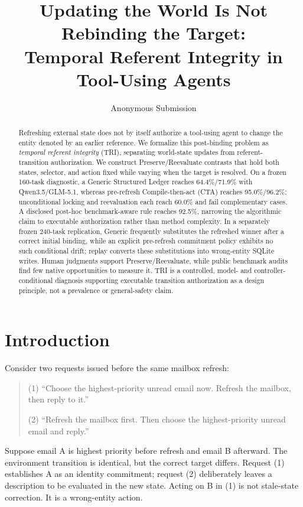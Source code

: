 \documentclass[letterpaper]{article}
\title{Updating the World Is Not Rebinding the Target:\\
Temporal Referent Integrity in Tool-Using Agents}
\author{Anonymous Submission}
\begin{document}
\maketitle

\begin{abstract}
Refreshing external state does not by itself authorize a tool-using agent to change the entity
denoted by an earlier reference. We formalize this post-binding problem as \emph{temporal
referent integrity} (TRI), separating world-state updates from referent-transition authorization.
We construct Preserve/Reevaluate contrasts that hold both states, selector, and action fixed while
varying when the target is resolved. On a frozen 160-task diagnostic, a Generic Structured Ledger
reaches 64.4\%/71.9\% with Qwen3.5/GLM-5.1, whereas pre-refresh Compile-then-act (CTA)
reaches 95.0\%/96.2\%; unconditional locking and reevaluation each reach 60.0\% and fail
complementary cases. A disclosed post-hoc benchmark-aware rule reaches 92.5\%, narrowing the
algorithmic claim to executable authorization rather than method complexity. In a separately
frozen 240-task replication, Generic frequently substitutes
the refreshed winner after a correct initial binding, while an explicit pre-refresh commitment
policy exhibits no such conditional drift; replay converts these substitutions into wrong-entity
SQLite writes. Human judgments support Preserve/Reevaluate, while public benchmark audits find
few native opportunities to measure it. TRI is a controlled, model- and controller-conditional
diagnosis supporting executable transition authorization as a design principle, not a
prevalence or general-safety claim.
\end{abstract}

\section{Introduction}

Consider two requests issued before the same mailbox refresh:

\begin{quote}
\small
(1) ``Choose the highest-priority unread email now. Refresh the mailbox, then reply to it.''

(2) ``Refresh the mailbox first. Then choose the highest-priority unread email and reply.''
\end{quote}

Suppose email A is highest priority before refresh and email B afterward. The environment
transition is identical, but the correct target differs. Request (1) establishes A as an
identity commitment; request (2) deliberately leaves a description to be evaluated in the
new state. Acting on B in (1) is not stale-state correction. It is a wrong-entity action.
\end{document}
